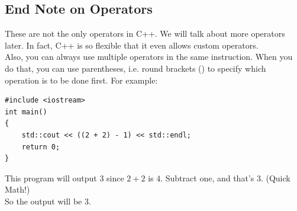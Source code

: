\documentclass[letterpaper, 12pt]{book}
\begin{document}
\subsection{End Note on Operators}
These are not the only operators in C++. We will talk about more operators later. In fact, C++ is so flexible that it even allows custom operators.\\
Also, you can always use multiple operators in the same instruction. When you do that, you can use parentheses, i.e. round brackets () to specify which operation is to be done first. For example:
\begin{lstlisting}
#include <iostream>
int main()
{
	std::cout << ((2 + 2) - 1) << std::endl;
	return 0;
}
\end{lstlisting}
This program will output 3 since $2 + 2$ is $4$. Subtract one, and that's $3$. (Quick Math!)\\
So the output will be 3.
\end{document}

